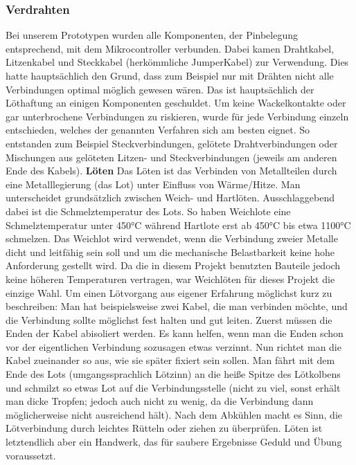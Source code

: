 \documentclass[11pt, twoside]{article}
\begin{document}
\subsubsection{Verdrahten}
Bei unserem Prototypen wurden alle Komponenten, der Pinbelegung entsprechend, mit dem Mikrocontroller verbunden. Dabei kamen Drahtkabel, Litzenkabel und Steckkabel (herkömmliche JumperKabel) zur Verwendung. Dies hatte hauptsächlich den Grund, dass zum Beispiel nur mit Drähten nicht alle Verbindungen optimal möglich gewesen wären. Das ist hauptsächlich der Löthaftung an einigen Komponenten geschuldet. Um keine Wackelkontakte oder gar unterbrochene Verbindungen zu riskieren, wurde für jede Verbindung einzeln entschieden, welches der genannten Verfahren sich am besten eignet. So entstanden zum Beispiel Steckverbindungen, gelötete Drahtverbindungen oder Mischungen aus gelöteten Litzen- und Steckverbindungen (jeweils am anderen Ende des Kabels).
\vspace{4mm}\newline
\textbf{Löten}\newline
\glqq Das Löten ist das Verbinden von Metallteilen durch eine Metalllegierung (das Lot) unter Einfluss von Wärme/Hitze.\grqq{} \parencite{noauthor_urlnl13_nodate} \newline
Man unterscheidet grundsätzlich zwischen Weich- und Hartlöten. Ausschlaggebend dabei ist die Schmelztemperatur des Lots. So haben Weichlote eine Schmelztemperatur unter 450°C während Hartlote erst ab 450°C bis etwa 1100°C schmelzen. \glqq Das Weichlot wird verwendet, wenn die Verbindung zweier Metalle dicht und leitfähig sein soll und um die mechanische Belastbarkeit keine hohe Anforderung gestellt wird.\grqq{} \parencite{noauthor_urlnl13_nodate} \newline
Da die in diesem Projekt benutzten Bauteile jedoch keine höheren Temperaturen vertragen, war Weichlöten für dieses Projekt die einzige Wahl. \newline
Um einen Lötvorgang aus eigener Erfahrung möglichst kurz zu beschreiben:\newline
Man hat beispielsweise zwei Kabel, die man verbinden möchte, und die Verbindung sollte möglichst fest halten und gut leiten. Zuerst müssen die Enden der Kabel abisoliert werden. Es kann helfen, wenn man die Enden schon vor der eigentlichen Verbindung sozusagen etwas \glqq verzinnt\grqq{}. Nun richtet man die Kabel zueinander so aus, wie sie später fixiert sein sollen. Man fährt mit dem Ende des Lots (umgangssprachlich Lötzinn) an die heiße Spitze des Lötkolbens und schmilzt so etwas Lot auf die Verbindungsstelle (nicht zu viel, sonst erhält man dicke Tropfen; jedoch auch nicht zu wenig, da die Verbindung dann möglicherweise nicht ausreichend hält). Nach dem Abkühlen macht es Sinn, die Lötverbindung durch leichtes Rütteln oder ziehen zu überprüfen. Löten ist letztendlich aber ein Handwerk, das für saubere Ergebnisse Geduld und Übung voraussetzt.
\vspace{4mm}\newline
\parencite[vgl.][]{noauthor_urlnl13_nodate}
\end{document}
